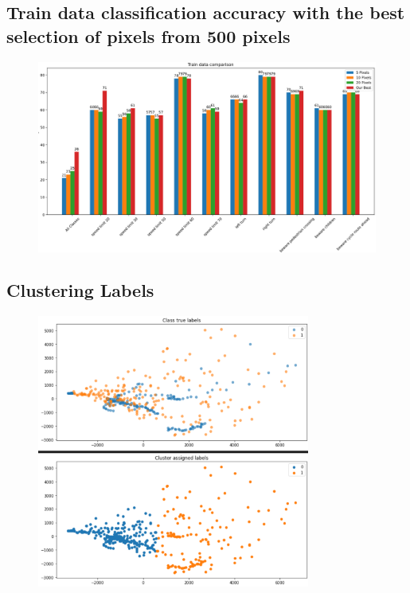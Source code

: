 \documentclass[11pt]{article}
\begin{document}
\begin{appendices}
\subsection{Train data classification accuracy with the best selection of pixels from 500 pixels}\label{test_data_500_pixels}
\begin{figure}[h!]
  \centering
  \includegraphics[scale=0.4]{images/train_data_comparison_pixels.PNG}
\end{figure}


\newpage
\subsection{Clustering Labels}\label{LabelClusters1} 
\begin{figure}[h!]
  \centering
  \includegraphics[width=0.8\textwidth]{Images/LabelClusters1.png}
\end{figure}


\end{appendices}
\end{document}
